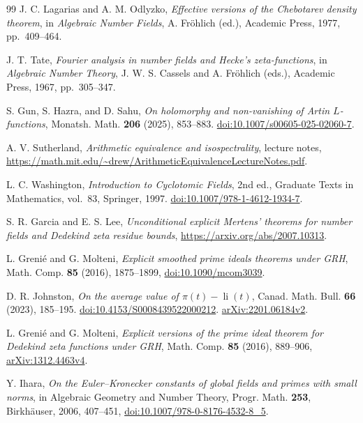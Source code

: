 \documentclass[11pt]{amsart}
\theoremstyle{definition}
\theoremstyle{remark}
\numberwithin{equation}{section}
\begin{document}
\begin{thebibliography}{99}
J. C. Lagarias and A. M. Odlyzko, \emph{Effective versions of the
Chebotarev density theorem}, in \emph{Algebraic Number Fields},
A. Fr\"ohlich (ed.), Academic Press, 1977, pp.~409--464.

J. T. Tate, \emph{Fourier analysis in number fields and Hecke's
zeta-functions}, in \emph{Algebraic Number Theory},
J. W. S. Cassels and A. Fr\"ohlich (eds.), Academic Press, 1967,
pp.~305--347.

S. Gun, S. Hazra, and D. Sahu,
\emph{On holomorphy and non-vanishing of Artin \(L\)-functions},
Monatsh. Math. \textbf{206} (2025), 853--883.
\href{https://doi.org/10.1007/s00605-025-02060-7}{doi:10.1007/s00605-025-02060-7}.

A. V. Sutherland, \emph{Arithmetic equivalence and isospectrality},
lecture notes, \url{https://math.mit.edu/~drew/ArithmeticEquivalenceLectureNotes.pdf}.

L. C. Washington, \emph{Introduction to Cyclotomic Fields}, 2nd ed.,
Graduate Texts in Mathematics, vol.~83, Springer, 1997.
\href{https://doi.org/10.1007/978-1-4612-1934-7}{doi:10.1007/978-1-4612-1934-7}.

S. R. Garcia and E. S. Lee,
\emph{Unconditional explicit Mertens' theorems for number fields and
Dedekind zeta residue bounds},
\url{https://arxiv.org/abs/2007.10313}.

L. Greni\'e and G. Molteni,
\emph{Explicit smoothed prime ideals theorems under GRH},
Math. Comp. \textbf{85} (2016), 1875--1899,
\href{https://doi.org/10.1090/mcom3039}{doi:10.1090/mcom3039}.

D. R. Johnston,
\emph{On the average value of \(\pi(t)-\operatorname{li}(t)\)},
Canad. Math. Bull. \textbf{66} (2023), 185--195.
\href{https://doi.org/10.4153/S0008439522000212}{doi:10.4153/S0008439522000212}.
\href{https://arxiv.org/abs/2201.06184v2}{arXiv:2201.06184v2}.

L. Greni\'e and G. Molteni,
\emph{Explicit versions of the prime ideal theorem for Dedekind zeta
functions under GRH},
Math. Comp. \textbf{85} (2016), 889--906,
\href{https://arxiv.org/abs/1312.4463v4}{arXiv:1312.4463v4}.

Y. Ihara,
\emph{On the Euler--Kronecker constants of global fields and primes
with small norms},
in Algebraic Geometry and Number Theory, Progr. Math. \textbf{253},
Birkh\"auser, 2006, 407--451,
\href{https://doi.org/10.1007/978-0-8176-4532-8_5}
{doi:10.1007/978-0-8176-4532-8\_5}.


\end{thebibliography}
\end{document}

